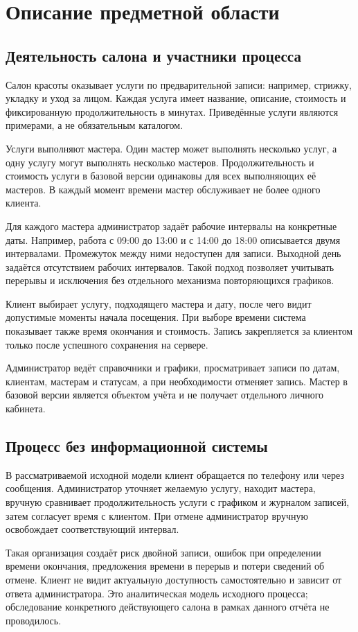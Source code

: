 \section{Описание предметной области}
\subsection{Деятельность салона и участники процесса}
Салон красоты оказывает услуги по предварительной записи: например, стрижку, укладку и уход за лицом. Каждая услуга имеет название, описание, стоимость и фиксированную продолжительность в минутах. Приведённые услуги являются примерами, а не обязательным каталогом.

Услуги выполняют мастера. Один мастер может выполнять несколько услуг, а одну услугу могут выполнять несколько мастеров. Продолжительность и стоимость услуги в базовой версии одинаковы для всех выполняющих её мастеров. В каждый момент времени мастер обслуживает не более одного клиента.

Для каждого мастера администратор задаёт рабочие интервалы на конкретные даты. Например, работа с 09:00 до 13:00 и с 14:00 до 18:00 описывается двумя интервалами. Промежуток между ними недоступен для записи. Выходной день задаётся отсутствием рабочих интервалов. Такой подход позволяет учитывать перерывы и исключения без отдельного механизма повторяющихся графиков.

Клиент выбирает услугу, подходящего мастера и дату, после чего видит допустимые моменты начала посещения. При выборе времени система показывает также время окончания и стоимость. Запись закрепляется за клиентом только после успешного сохранения на сервере.

Администратор ведёт справочники и графики, просматривает записи по датам, клиентам, мастерам и статусам, а при необходимости отменяет запись. Мастер в базовой версии является объектом учёта и не получает отдельного личного кабинета.

\subsection{Процесс без информационной системы}
В рассматриваемой исходной модели клиент обращается по телефону или через сообщения. Администратор уточняет желаемую услугу, находит мастера, вручную сравнивает продолжительность услуги с графиком и журналом записей, затем согласует время с клиентом. При отмене администратор вручную освобождает соответствующий интервал.

Такая организация создаёт риск двойной записи, ошибок при определении времени окончания, предложения времени в перерыв и потери сведений об отмене. Клиент не видит актуальную доступность самостоятельно и зависит от ответа администратора. Это аналитическая модель исходного процесса; обследование конкретного действующего салона в рамках данного отчёта не проводилось.

